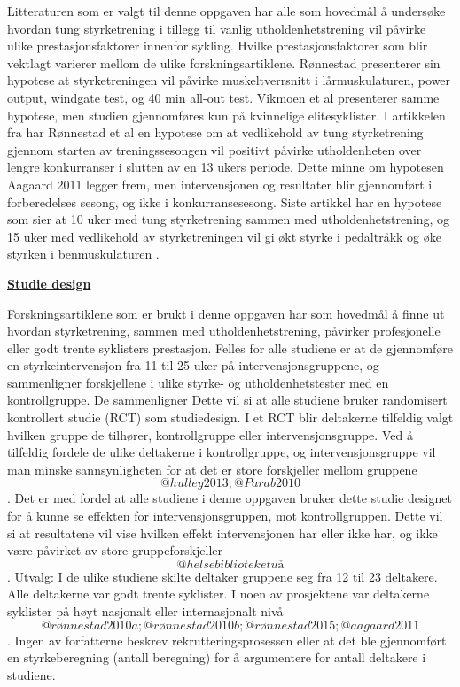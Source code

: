 \documentclass[
]{book}
\begin{document}
Litteraturen som er valgt til denne oppgaven har alle som hovedmål å undersøke hvordan tung styrketrening i tillegg til vanlig utholdenhetstrening vil påvirke ulike prestasjonsfaktorer innenfor sykling. Hvilke prestasjonsfaktorer som blir vektlagt varierer mellom de ulike forskningsartiklene. Rønnestad \citep{rønnestad2010b} presenterer sin hypotese at styrketreningen vil påvirke muskeltverrsnitt i lårmuskulaturen, power output, windgate test, og 40 min all-out test. Vikmoen et al \citep{vikmoen2016} presenterer samme hypotese, men studien gjennomføres kun på kvinnelige elitesyklister. I artikkelen fra \citep{rønnestad2010a} har Rønnestad et al en hypotese om at vedlikehold av tung styrketrening gjennom starten av treningssesongen vil positivt påvirke utholdenheten over lengre konkurranser i slutten av en 13 ukers periode. Dette minne om hypotesen Aagaard 2011 legger frem, men intervensjonen og resultater blir gjennomført i forberedelses sesong, og ikke i konkurransesesong. Siste artikkel har en hypotese som sier at 10 uker med tung styrketrening sammen med utholdenhetstrening, og 15 uker med vedlikehold av styrketreningen vil gi økt styrke i pedaltråkk og øke styrken i benmuskulaturen \citep{rønnestad2015}.

\underline{\textbf{Studie design}}

Forskningsartiklene som er brukt i denne oppgaven har som hovedmål å finne ut hvordan styrketrening, sammen med utholdenhetstrening, påvirker profesjonelle eller godt trente syklisters prestasjon. Felles for alle studiene er at de gjennomføre en styrkeintervensjon fra 11 til 25 uker på intervensjonsgruppene, og sammenligner forskjellene i ulike styrke- og utholdenhetstester med en kontrollgruppe. De sammenligner Dette vil si at alle studiene bruker randomisert kontrollert studie (RCT) som studiedesign. I et RCT blir deltakerne tilfeldig valgt hvilken gruppe de tilhører, kontrollgruppe eller intervensjonsgruppe. Ved å tilfeldig fordele de ulike deltakerne i kontrollgruppe, og intervensjonsgruppe vil man minske sannsynligheten for at det er store forskjeller mellom gruppene \[@hulley2013; @Parab2010\]. Det er med fordel at alle studiene i denne oppgaven bruker dette studie designet for å kunne se effekten for intervensjonsgruppen, mot kontrollgruppen. Dette vil si at resultatene vil vise hvilken effekt intervensjonen har eller ikke har, og ikke være påvirket av store gruppeforskjeller \[@helsebiblioteketuå\] . Utvalg: I de ulike studiene skilte deltaker gruppene seg fra 12 til 23 deltakere. Alle deltakerne var godt trente syklister. I noen av prosjektene var deltakerne syklister på høyt nasjonalt eller internasjonalt nivå \[@rønnestad2010a; @rønnestad2010b; @rønnestad2015; @aagaard2011\]. Ingen av forfatterne beskrev rekrutteringsprosessen eller at det ble gjennomført en styrkeberegning (antall beregning) for å argumentere for antall deltakere i studiene.
\end{document}
